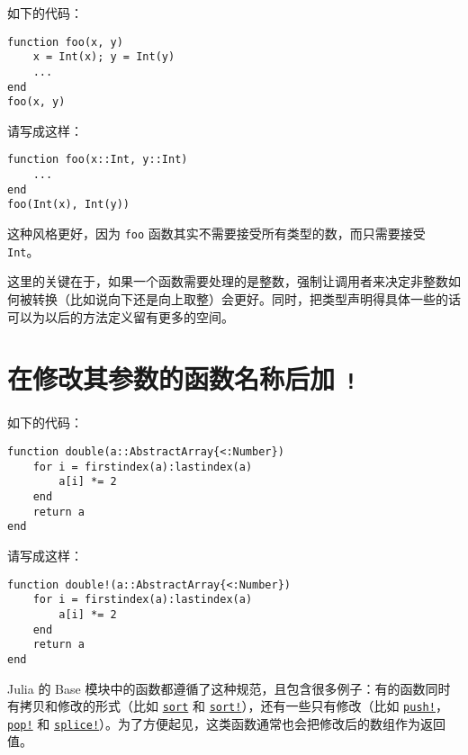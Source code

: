 如下的代码：




\begin{verbatim}
function foo(x, y)
    x = Int(x); y = Int(y)
    ...
end
foo(x, y)
\end{verbatim}



请写成这样：




\begin{verbatim}
function foo(x::Int, y::Int)
    ...
end
foo(Int(x), Int(y))
\end{verbatim}



这种风格更好，因为 \texttt{foo} 函数其实不需要接受所有类型的数，而只需要接受 \texttt{Int}。



这里的关键在于，如果一个函数需要处理的是整数，强制让调用者来决定非整数如何被转换（比如说向下还是向上取整）会更好。同时，把类型声明得具体一些的话可以为以后的方法定义留有更多的空间。



\hypertarget{1684346418186777370}{}


\section{在修改其参数的函数名称后加 \texttt{!}}



如下的代码：




\begin{verbatim}
function double(a::AbstractArray{<:Number})
    for i = firstindex(a):lastindex(a)
        a[i] *= 2
    end
    return a
end
\end{verbatim}



请写成这样：




\begin{verbatim}
function double!(a::AbstractArray{<:Number})
    for i = firstindex(a):lastindex(a)
        a[i] *= 2
    end
    return a
end
\end{verbatim}



Julia 的 Base 模块中的函数都遵循了这种规范，且包含很多例子：有的函数同时有拷贝和修改的形式（比如 \hyperlink{8473525809131227606}{\texttt{sort}} 和 \hyperlink{12296873681374954808}{\texttt{sort!}}），还有一些只有修改（比如 \hyperlink{18026893834387542681}{\texttt{push!}}，\hyperlink{14467641005327674015}{\texttt{pop!}} 和 \hyperlink{13785507599688955371}{\texttt{splice!}}）。为了方便起见，这类函数通常也会把修改后的数组作为返回值。



